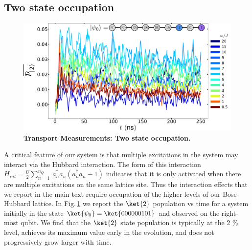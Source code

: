 \subsection{Two state occupation}
\begin{figure}[tbh]
    \centering
    \includegraphics[width=150mm, keepaspectratio]{./PDF/fs6_190919_1238p.pdf}
    \caption{\textbf{Transport Measurements:  Two state occupation.}
    \label{transport_two_state_occupation}
    }\end{figure}
\begin{sloppypar}
    A critical feature of our system is that multiple excitations in the system may interact via the Hubbard interaction.
    The form of this interaction
    $H_{int} = \frac{U}{2}\sum\limits_{n=1}^{n_{Q}} \,a^{\dagger}_{n}a_n(a^{\dagger}_{n}a_n-1)$
    indicates that it is only activated when there are multiple excitations on the same lattice site.
    Thus the interaction effects that we report in the main text require occupation of the higher levels of our Bose-Hubbard lattice.
    In Fig.\,\ref{transport_two_state_occupation} we report the $\ket{2}$ population vs time for a system initially in the state $\ket{\psi_0}=\ket{000000101}$ and observed on the right-most qubit.
    We find that the $\ket{2}$ state population is typically at the 2 \% level,
    achieves its maximum value early in the evolution, and does not progressively grow larger with time.
\end{sloppypar}

